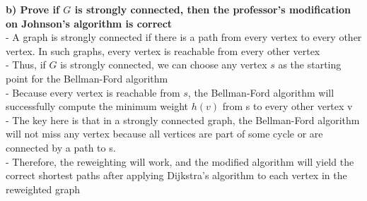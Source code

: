 \documentclass[letterpaper,12pt]{article}
\begin{document}
\begin{enumerate}
\textbf{b) Prove if $G$ is strongly connected, then the professor's
modification on Johnson's algorithm is correct} \\
- A graph is strongly connected if there is a path from every vertex to every other vertex. In such graphs, every vertex is reachable from every other vertex \\
- Thus, if $G$ is strongly connected, we can choose any vertex $s$ as the starting point for the Bellman-Ford algorithm \\
- Because every vertex is reachable from $s$, the Bellman-Ford algorithm will successfully compute the minimum weight $h(v)$ from s to every other vertex v \\
- The key here is that in a strongly connected graph, the Bellman-Ford algorithm will not miss any vertex because all vertices are part of some cycle or are connected by a path to s. \\
- Therefore, the reweighting will work, and the modified algorithm will yield the correct shortest paths after applying Dijkstra's algorithm to each vertex in the reweighted graph \\

\end{enumerate}
\end{document}
